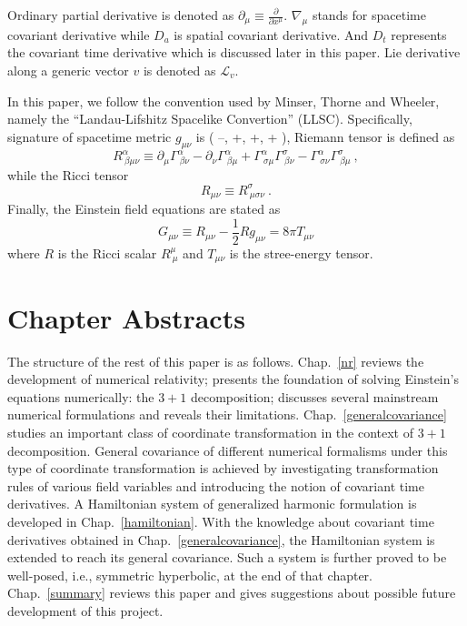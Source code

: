 Ordinary partial derivative is denoted as $
\partial_{\mu} \equiv \frac{\partial}{\partial x^{\mu}}$. $\nabla_{\mu}$ stands for spacetime covariant derivative while $D_{a}$ is spatial covariant derivative. And $D_{t}$ represents the covariant time derivative which is discussed later in this paper. Lie derivative along a generic vector $v$ is denoted as $\mathcal{L}_{v}$. 

In this paper, we follow the convention used by Minser, Thorne and Wheeler\cite{Misner:1974qy}, namely the ``Landau-Lifshitz Spacelike Convertion'' (LLSC). Specifically, signature of spacetime metric $g_{\mu\nu}$ is ( --, +, +, + ), Riemann tensor is defined as 
\begin{equation}
	R^{\alpha}_{~\beta \mu \nu} \equiv 
	\partial_{\mu}\Gamma^{\alpha}_{~\beta \nu} - 
	\partial_{\nu}\Gamma^{\alpha}_{~\beta \mu} + \Gamma^{\alpha}_{~\sigma \mu}\Gamma^{\sigma}_{~\beta \nu} - \Gamma^{\alpha}_{~\sigma \nu}\Gamma^{\sigma}_{~\beta\mu} \ , 
\end{equation}
while the Ricci tensor 
\begin{equation}
	R_{\mu\nu} \equiv R^{\sigma}_{~\mu\sigma\nu} \ . 
\end{equation}
Finally, the Einstein field equations are stated as 
\begin{equation}
	G_{\mu\nu} \equiv R_{\mu\nu} - \frac{1}{2} R g_{\mu\nu} = 8\pi T_{\mu\nu} 
\end{equation}
where $R$ is the Ricci scalar $R^{\mu}_{~\mu}$ and $T_{\mu\nu}$ is the stree-energy tensor. 

\section{Chapter Abstracts}\label{abstracts}
The structure of the rest of this paper is as follows. Chap.~\ref{nr} reviews the development of numerical relativity; presents the foundation of solving Einstein's equations numerically: the $3 + 1$ decomposition; discusses several mainstream numerical formulations and reveals their limitations. Chap.~\ref{generalcovariance} studies an important class of coordinate transformation in the context of $3 + 1$ decomposition. General covariance of different numerical formalisms under this type of coordinate transformation is achieved by investigating transformation rules of various field variables and introducing the notion of covariant time derivatives. A Hamiltonian system of generalized harmonic formulation is developed in Chap.~\ref{hamiltonian}. With the knowledge about covariant time derivatives obtained in Chap.~\ref{generalcovariance}, the Hamiltonian system is extended to reach its general covariance. Such a system is further proved to be well-posed, i.e., symmetric hyperbolic, at the end of that chapter. Chap.~\ref{summary} reviews this paper and gives suggestions about possible future development of this project. 
